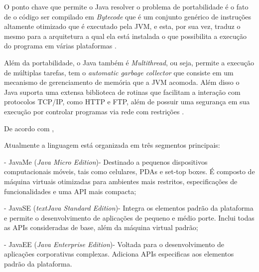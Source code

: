 
\par O ponto chave que
permite o Java resolver o problema de portabilidade é o fato de o código ser
compilado em \textit{Bytecode} que é um conjunto genérico de instruções
altamente otimizado que é executado pela JVM, e esta, por sua vez, traduz o
mesmo para a arquitetura a qual ela está instalada o que possibilita a execução do programa
em várias plataformas \cite{livro_java_complete_references}.


% 
% 
% 


\par Além da portabilidade, o Java também é \textit{Multithread}, ou seja,
permite a execução de múltiplas tarefas, tem o \textit{automatic garbage
collector} que consiste em um mecanismo de gerenciamento de memória que a JVM
acomoda. Além disso o Java suporta uma extensa biblioteca de rotinas que
facilitam a interação com protocolos TCP/IP, como HTTP e FTP, além de possuir uma
segurança em sua execução por controlar programas via rede com
restrições \cite{livro_java_complete_references}.

\par De acordo com , 

\begin{citacao} Atualmente a linguagem está organizada em três segmentos
principais:


	- JavaMe (\textit{Java Micro Edition})- Destinado a pequenos dispositivos
	computacionais móveis, tais como celulares, PDAs e set-top boxes. É composto de máquina virtuais otimizadas para ambientes mais restritos, especificações de 
funcionalidades e uma API mais compacta; 
	  
	- JavaSE (\textit{textJava Standard Edition})- Integra os elementos padrão
	da plataforma e permite o desenvolvimento de aplicações de pequeno e médio porte. Inclui todas as APIs consideradas de base,
além da máquina virtual padrão;

	- JavaEE (\textit{Java Enterprise Edition})- Voltada para o desenvolvimento
	de aplicações corporativas complexas. Adiciona APIs especificas aos elementos padrão da plataforma.
	

\end{citacao}

